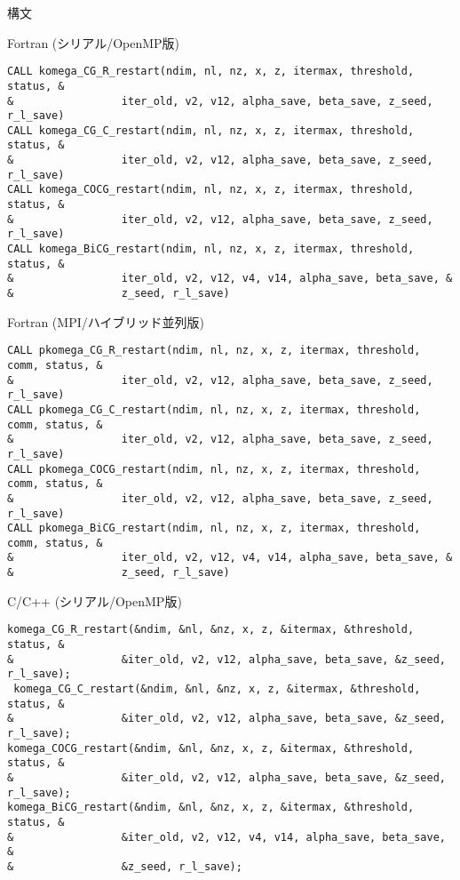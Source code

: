 \documentclass[12pt,titlepage]{jarticle}
\begin{document}
  \noindent 構文
  
  \noindent Fortran (シリアル/OpenMP版)
  
\begin{verbatim}
CALL komega_CG_R_restart(ndim, nl, nz, x, z, itermax, threshold, status, &
&                 iter_old, v2, v12, alpha_save, beta_save, z_seed, r_l_save)
CALL komega_CG_C_restart(ndim, nl, nz, x, z, itermax, threshold, status, &
&                 iter_old, v2, v12, alpha_save, beta_save, z_seed, r_l_save)
CALL komega_COCG_restart(ndim, nl, nz, x, z, itermax, threshold, status, &
&                 iter_old, v2, v12, alpha_save, beta_save, z_seed, r_l_save)
CALL komega_BiCG_restart(ndim, nl, nz, x, z, itermax, threshold, status, &
&                 iter_old, v2, v12, v4, v14, alpha_save, beta_save, &
&                 z_seed, r_l_save)
\end{verbatim}

  \noindent Fortran (MPI/ハイブリッド並列版)
  
\begin{verbatim}
CALL pkomega_CG_R_restart(ndim, nl, nz, x, z, itermax, threshold, comm, status, &
&                 iter_old, v2, v12, alpha_save, beta_save, z_seed, r_l_save)
CALL pkomega_CG_C_restart(ndim, nl, nz, x, z, itermax, threshold, comm, status, &
&                 iter_old, v2, v12, alpha_save, beta_save, z_seed, r_l_save)
CALL pkomega_COCG_restart(ndim, nl, nz, x, z, itermax, threshold, comm, status, &
&                 iter_old, v2, v12, alpha_save, beta_save, z_seed, r_l_save)
CALL pkomega_BiCG_restart(ndim, nl, nz, x, z, itermax, threshold, comm, status, &
&                 iter_old, v2, v12, v4, v14, alpha_save, beta_save, &
&                 z_seed, r_l_save)
\end{verbatim}

  \noindent C/C++ (シリアル/OpenMP版)
  
\begin{verbatim}
komega_CG_R_restart(&ndim, &nl, &nz, x, z, &itermax, &threshold, status, &
&                 &iter_old, v2, v12, alpha_save, beta_save, &z_seed, r_l_save);
 komega_CG_C_restart(&ndim, &nl, &nz, x, z, &itermax, &threshold, status, &
&                 &iter_old, v2, v12, alpha_save, beta_save, &z_seed, r_l_save);
komega_COCG_restart(&ndim, &nl, &nz, x, z, &itermax, &threshold, status, &
&                 &iter_old, v2, v12, alpha_save, beta_save, &z_seed, r_l_save);
komega_BiCG_restart(&ndim, &nl, &nz, x, z, &itermax, &threshold, status, &
&                 &iter_old, v2, v12, v4, v14, alpha_save, beta_save, &
&                 &z_seed, r_l_save);
\end{verbatim}
\end{document}

